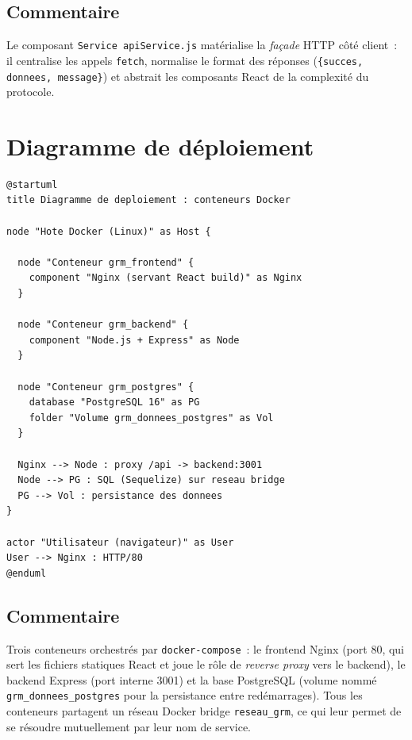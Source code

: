 \documentclass[a4paper,11pt,openany]{report}
\begin{document}
\subsection{Commentaire}

Le composant \texttt{Service apiService.js} matérialise la
\emph{façade} HTTP côté client~: il centralise les appels
\texttt{fetch}, normalise le format des réponses
(\texttt{\{succes, donnees, message\}}) et abstrait les composants
React de la complexité du protocole.

\section{Diagramme de déploiement}

\begin{lstlisting}[caption={Diagramme UML --- Déploiement Docker},
                   label={lst:umlDeploiement}]
@startuml
title Diagramme de deploiement : conteneurs Docker

node "Hote Docker (Linux)" as Host {

  node "Conteneur grm_frontend" {
    component "Nginx (servant React build)" as Nginx
  }

  node "Conteneur grm_backend" {
    component "Node.js + Express" as Node
  }

  node "Conteneur grm_postgres" {
    database "PostgreSQL 16" as PG
    folder "Volume grm_donnees_postgres" as Vol
  }

  Nginx --> Node : proxy /api -> backend:3001
  Node --> PG : SQL (Sequelize) sur reseau bridge
  PG --> Vol : persistance des donnees
}

actor "Utilisateur (navigateur)" as User
User --> Nginx : HTTP/80
@enduml
\end{lstlisting}

\subsection{Commentaire}

Trois conteneurs orchestrés par \texttt{docker-compose}~: le
frontend Nginx (port 80, qui sert les fichiers statiques React
et joue le rôle de \emph{reverse proxy} vers le backend), le
backend Express (port interne 3001) et la base PostgreSQL
(volume nommé \texttt{grm\_donnees\_postgres} pour la
persistance entre redémarrages). Tous les conteneurs partagent
un réseau Docker bridge \texttt{reseau\_grm}, ce qui leur
permet de se résoudre mutuellement par leur nom de service.
\end{document}
